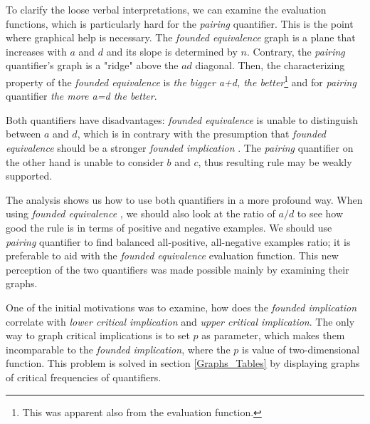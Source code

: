 To clarify the loose verbal interpretations, we can examine the evaluation functions, which is particularly hard for the {\it pairing \/} quantifier. This is the point where graphical help is necessary. The {\it founded equivalence \/} graph is a plane that increases with $a$ and $d$ and its slope is determined by $n$. Contrary, the {\it pairing \/} quantifier's graph is a "ridge" above the $a d$ diagonal. Then, the characterizing property of the {\it founded equivalence \/} is \emph{the bigger a+d, the better}\footnote{This was apparent also from the evaluation function.} and for {\it pairing \/} quantifier \emph{the more a=d the better}.

Both quantifiers have disadvantages: {\it founded equivalence \/} is unable to distinguish between $a$ and $d$, which is in contrary with the presumption that {\it founded equivalence \/} should be a stronger {\it founded implication \/}. The {\it pairing \/} quantifier on the other hand is unable to consider $b$ and $c$, thus resulting rule may be weakly supported. 

The analysis shows us how to use both quantifiers in a more profound way. When using {\it founded equivalence \/}, we should also look at the ratio of $a/d$ to see how good the rule is in terms of positive and negative examples. We should use {\it pairing \/} quantifier to find balanced all-positive, all-negative examples ratio; it is preferable to aid
with the {\it founded equivalence \/} evaluation function. This new perception of the two quantifiers was made possible mainly by examining their graphs.

\medskip

One of the initial motivations was to examine, how does the \emph{founded implication}
correlate with \emph{lower critical implication }and \emph{upper critical implication}.
The only way to graph critical implications is to set $p$ as parameter, which
makes them incomparable to the \emph{founded implication}, where the $p$ is value
of two-dimensional function. This problem is solved in section \ref{Graphs_Tables} by
displaying graphs of critical frequencies of quantifiers. 